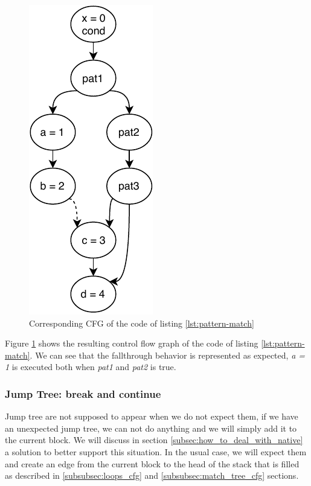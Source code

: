\begin{figure}[h]
	\caption{Corresponding CFG of the code of listing \ref{lst:pattern-match}}
	\label{figure:pat-mat-cfg}
	\includegraphics[]{figure/pat-mat-cfg.pdf}
\end{figure}



Figure \ref{figure:pat-mat-cfg} shows the resulting control flow graph of the code of listing \ref{lst:pattern-match}. We can see that the fallthrough behavior is represented as expected, \emph{a = 1} is executed both when \emph{pat1} and \emph{pat2} is true.

\subsubsection{Jump Tree: break and continue}
\label{subsubsec:jump_tree_cfg}

Jump tree are not supposed to appear when we do not expect them, if we have an unexpected jump tree, we can not do anything and we will simply add it to the current block. 
We will discuss in section \ref{subsec:how_to_deal_with_native} a solution to better support this situation.
In the usual case, we will expect them and create an edge from the current block to the head of the stack that is filled as described in \ref{subsubsec:loops_cfg} and \ref{subsubsec:match_tree_cfg} sections.

